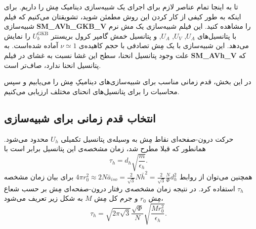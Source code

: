 تا به اینجا تمام عناصر لازم برای اجرای یک شبیه‌سازی دینامیک مِش را داریم. برای اینکه به طور کیفی از کار کردن این روش مطمئن شوید، تشویقتان می‌کنیم که فیلم‌ شبیه‌سازی
\textbf{SM\_AVh\_GKB\_V} 
را مشاهده کنید. این فیلم شبیه‌سازی یک مش نرم با پتانسیل‌های 
$U_A$, $U_V$, $U_A$, 
و پتانسیل خمش گامپر کرول بریسنتر 
$U_b^\text{GKB}$
را نمایش می‌دهد. این شبیه‌سازی با یک مِش تصادفی با حجم کاهیده‌ی 
 $\nu\simeq1$
آماده شده‌است. به علت وجود پتانسیل انحنا، سطح این غشا نسبت به غشای در فیلم
\textbf{SM\_AVh\_V}
که پتانسیل انحنا ندارد، صاف‌تر است.

در این بخش، قدم زمانی مناسب برای شبیه‌سازی‌های دینامیکِ مِش را می‌یابیم و سپس محاسبات را برای پتانسیل‌های انحنای مختلف ارزیابی می‌کنیم.






\subsection{\label{sec:ResultsTimeStep}
انتخاب قدم زمانی برای شبیه‌سازی
}

حرکت درون-صفحه‌ای نقاط مِش به وسیله‌ی پتانسیل تکمیلی
$U_h$
محدود می‌شود. همانطور که قبلا مطرح شد، زمان مشخصه‌ی این پتانسیل برابر است با
\begin{equation}
\tau_{h}= d_h\sqrt{\frac{m}{\epsilon_h}}.
\label{eq:tauWCAh}
\end{equation}
همچنین می‌توان از روابط
 $4\pi r_0^2\approx2N\bar a_{iso}=\frac{2}{\sqrt{3}} N {\bar h}^2 = \frac{2}{\sqrt{3}} \frac{N}{\Phi} d_h^2$
برای بیان زمان مشخصه‌
$\tau_h$
استفاده کرد. در نتیجه زمان مشخصه‌ی رفتار درون-صفحه‌ای مِش بر حسب شعاع مِش 
 $r_0$
و جرم کل مِش
 $M$
به شکل زیر تعریف می‌شود،
\begin{equation}
\tau_{h}
=  \sqrt{2\pi\sqrt{3} }  \frac{\sqrt{\Phi}}{N}\sqrt{\frac{M r_0^2}{\epsilon_h}}.
\label{eq:tauWCAh M r0}
\end{equation}


